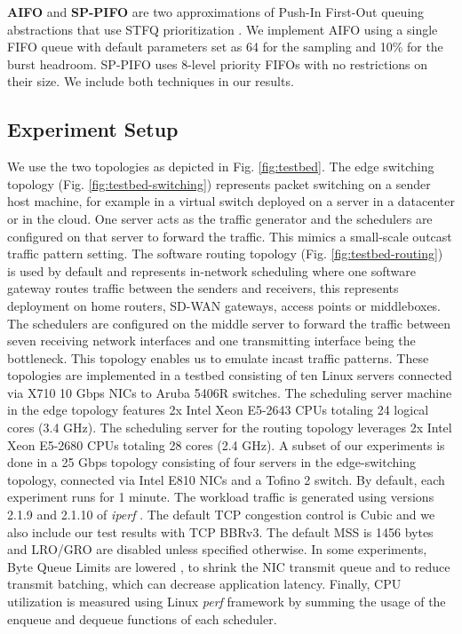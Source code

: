 \textbf{AIFO} and \textbf{SP-PIFO} are two approximations of Push-In First-Out queuing abstractions that use STFQ prioritization \cite{aifo,sppifo,pifo}. We implement AIFO using a single FIFO queue with default parameters set as 64 for the sampling and 10\% for the burst headroom. SP-PIFO uses 8-level priority FIFOs with no restrictions on their size. We include both techniques in our results.




\subsection{Experiment Setup}
\label{sec:testbed}

We use the two topologies as depicted in Fig. \ref{fig:testbed}.  The
edge switching topology (Fig. \ref{fig:testbed-switching}) represents
packet switching on a sender host machine, for example in a virtual
switch deployed on a server in a datacenter or in the cloud. One server
acts as the traffic generator and the schedulers are configured on
that server to forward the traffic. This mimics a small-scale outcast
traffic pattern setting.
The software routing topology (Fig. \ref{fig:testbed-routing}) is used
by default and represents in-network scheduling where one software
gateway routes traffic between the senders and receivers, this
represents deployment on home routers, SD-WAN gateways, access points
or middleboxes. The schedulers are configured on the middle server to
forward the traffic between seven receiving network interfaces and one
transmitting interface being the bottleneck. This topology
enables us to emulate incast traffic patterns.
These topologies are implemented in a testbed consisting of ten Linux
servers connected via X710 10 Gbps NICs to Aruba 5406R switches.
The scheduling server machine in the edge topology features 2x Intel
Xeon E5-2643 CPUs totaling 24 logical cores (3.4 GHz). The scheduling
server for the routing topology leverages 2x Intel Xeon E5-2680 CPUs
totaling 28 cores (2.4 GHz). A subset of our experiments is done in
a 25 Gbps topology consisting of four servers in the edge-switching
topology, connected via Intel E810 NICs and a Tofino 2 switch.
By default, each experiment runs for 1 minute. The
workload traffic is generated using versions 2.1.9 and 2.1.10 of \textit{iperf} \cite{iperf2}.
The default TCP congestion control is Cubic and we also include our test results with TCP BBRv3. The default MSS is 1456
bytes and LRO/GRO are disabled unless specified otherwise. In some
experiments, Byte Queue Limits are lowered \cite{bql}, to shrink the
NIC transmit queue and to reduce transmit batching, which can decrease
application latency.
Finally, CPU utilization is measured using Linux \textit{perf} framework \cite{linux-perf} by summing the usage of the enqueue and dequeue functions of each scheduler. 


